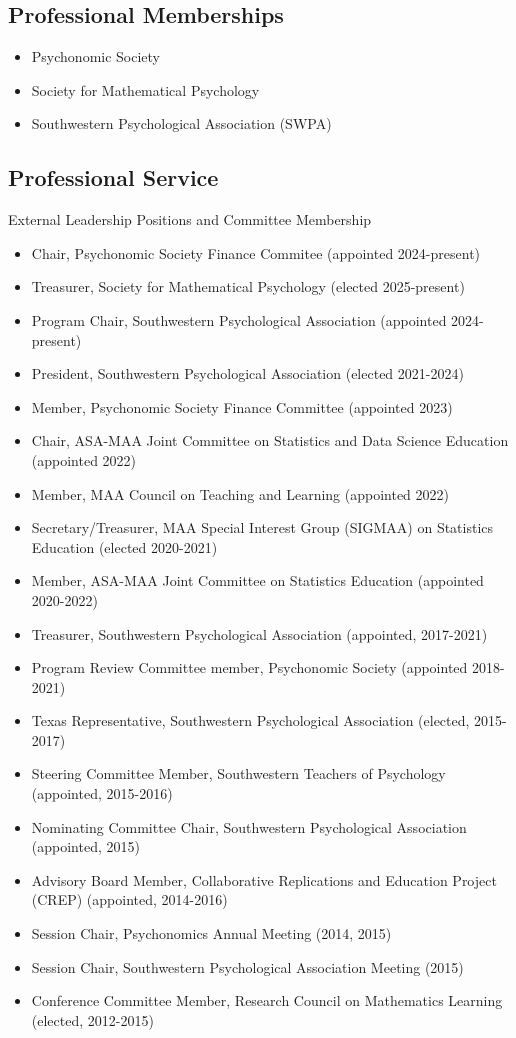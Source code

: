 \documentclass[article,10pt]{article}
\begin{document}
\subsection*{Professional Memberships}
\label{sec:org3f429af}
\begin{itemize}
\item Psychonomic Society
\item Society for Mathematical Psychology
\item Southwestern Psychological Association (SWPA)
\end{itemize}
\subsection*{Professional Service}
\label{sec:orgc592dd6}

External Leadership Positions and Committee Membership

\begin{itemize}
\item Chair, Psychonomic Society Finance Commitee (appointed 2024-present)
\item Treasurer, Society for Mathematical Psychology (elected 2025-present)
\item Program Chair, Southwestern Psychological Association (appointed 2024-present)
\item President, Southwestern Psychological Association (elected 2021-2024)
\item Member, Psychonomic Society Finance Committee (appointed 2023)
\item Chair, ASA-MAA Joint Committee on Statistics and Data Science Education (appointed 2022)
\item Member, MAA Council on Teaching and Learning (appointed 2022)
\item Secretary/Treasurer, MAA Special Interest Group (SIGMAA) on Statistics Education (elected 2020-2021)
\item Member, ASA-MAA Joint Committee on Statistics Education (appointed 2020-2022)
\item Treasurer, Southwestern Psychological Association (appointed, 2017-2021)
\item Program Review Committee member, Psychonomic Society (appointed 2018-2021)
\item Texas Representative, Southwestern Psychological Association (elected, 2015-2017)
\item Steering Committee Member, Southwestern Teachers of Psychology (appointed, 2015-2016)
\item Nominating Committee Chair, Southwestern Psychological Association (appointed, 2015)
\item Advisory Board Member, Collaborative Replications and Education Project (CREP) (appointed, 2014-2016)
\item Session Chair, Psychonomics Annual Meeting (2014, 2015)
\item Session Chair, Southwestern Psychological Association Meeting (2015)
\item Conference Committee Member, Research Council on Mathematics Learning (elected, 2012-2015)
\end{itemize}
\end{document}
